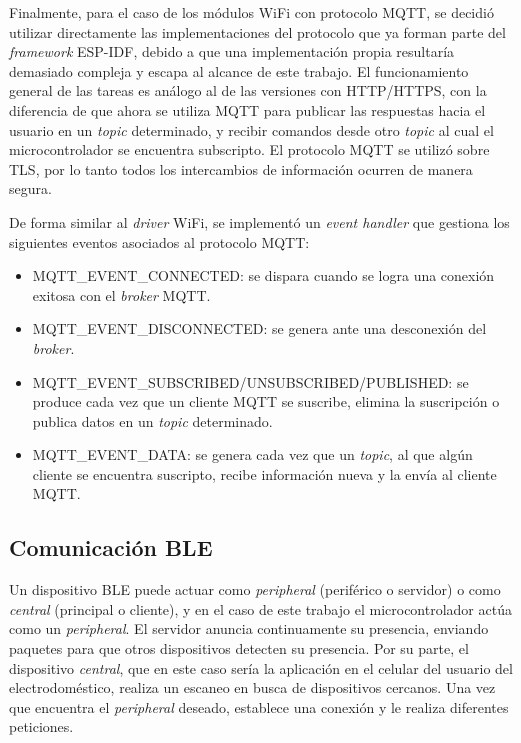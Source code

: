 Finalmente, para el caso de los módulos WiFi con protocolo MQTT, se decidió utilizar directamente las implementaciones del protocolo que ya forman parte del \emph{framework} ESP-IDF, debido a que una implementación propia resultaría demasiado compleja y escapa al alcance de este trabajo. El funcionamiento general de las tareas es análogo al de las versiones con HTTP/HTTPS, con la diferencia de que ahora se utiliza MQTT para publicar las respuestas hacia el usuario en un \emph{topic} determinado, y recibir comandos desde otro \emph{topic} al cual el microcontrolador se encuentra subscripto. El protocolo MQTT se utilizó sobre TLS, por lo tanto todos los intercambios de información ocurren de manera segura.

De forma similar al \emph{driver} WiFi, se implementó un \emph{event handler} que gestiona los siguientes eventos asociados al protocolo MQTT:

\begin{itemize}
	\item MQTT\_EVENT\_CONNECTED: se dispara cuando se logra una conexión exitosa con el \emph{broker} MQTT.
	\item MQTT\_EVENT\_DISCONNECTED: se genera ante una desconexión del \emph{broker}.
	\item MQTT\_EVENT\_SUBSCRIBED/UNSUBSCRIBED/PUBLISHED: se produce cada vez que un cliente MQTT se suscribe, elimina la suscripción o publica datos en un \emph{topic} determinado.
	\item MQTT\_EVENT\_DATA: se genera cada vez que un \emph{topic}, al que algún cliente se encuentra suscripto, recibe información nueva y la envía al cliente MQTT.
\end{itemize} 


\subsection{Comunicación BLE}
\label{sec:ble_com}

Un dispositivo BLE puede actuar como \emph{peripheral} (periférico o servidor) o como \emph{central} (principal o cliente), y en el caso de este trabajo el microcontrolador actúa como un \emph{peripheral}. El servidor anuncia continuamente su presencia, enviando paquetes para que otros dispositivos detecten su presencia. Por su parte, el dispositivo \emph{central}, que en este caso sería la aplicación en el celular del usuario del electrodoméstico, realiza un escaneo en busca de dispositivos cercanos. Una vez que encuentra el \emph{peripheral} deseado, establece una conexión y le realiza diferentes peticiones.

